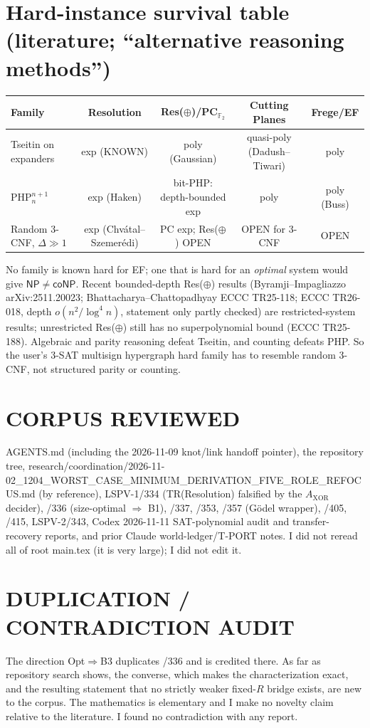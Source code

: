 \documentclass[11pt]{article}
\theoremstyle{definition}\newtheorem{definition}[theorem]{Definition}
\begin{document}
\section{Hard-instance survival table (literature; ``alternative reasoning methods'')}
\begin{center}\small
\begin{tabular}{lcccc}\toprule
Family & Resolution & Res($\oplus$)/PC$_{\mathbb F_2}$ & Cutting Planes & Frege/EF\\\midrule
Tseitin on expanders & exp (KNOWN) & poly (Gaussian) & quasi-poly (Dadush--Tiwari) & poly\\
PHP$^{n+1}_n$ & exp (Haken) & bit-PHP: depth-bounded exp & poly & poly (Buss)\\
Random 3-CNF, $\Delta\gg1$ & exp (Chv\'atal--Szemer\'edi) & PC exp; Res($\oplus$) OPEN & OPEN for 3-CNF & OPEN\\
\bottomrule\end{tabular}\end{center}
No family is known hard for EF; one that is hard for an \emph{optimal} system would give
$\mathsf{NP}\neq\mathsf{coNP}$. Recent bounded-depth Res($\oplus$) results
(Byramji--Impagliazzo arXiv:2511.20023; Bhattacharya--Chattopadhyay ECCC TR25-118;
ECCC TR26-018, depth $o(n^2/\log^4 n)$, statement only partly checked) are restricted-system
results; unrestricted Res($\oplus$) still has no superpolynomial bound (ECCC TR25-188).
Algebraic and parity reasoning defeat Tseitin, and counting defeats PHP. So the user's 3-SAT
multisign hypergraph hard family has to resemble random 3-CNF, not structured parity or counting.

\section*{CORPUS REVIEWED}
AGENTS.md (including the 2026-11-09 knot/link handoff pointer), the repository tree,
research/coordination/2026-11-02\_1204\_WORST\_CASE\_MINIMUM\_DERIVATION\_FIVE\_ROLE\_REFOCUS.md
(by reference), LSPV-1/334 (TR(Resolution) falsified by the $A_{\mathrm{XOR}}$ decider), /336 (size-optimal $\Rightarrow$ B1),
/337, /353, /357 (G\"odel wrapper), /405, /415, LSPV-2/343, Codex 2026-11-11 SAT-polynomial audit and
transfer-recovery reports, and prior Claude world-ledger/T-PORT notes. I did not reread all of root main.tex
(it is very large); I did not edit it.
\section*{DUPLICATION / CONTRADICTION AUDIT}
The direction Opt$\Rightarrow$B3 duplicates /336 and is credited there. As far as repository search
shows, the converse, which makes the characterization exact, and the resulting statement that no strictly
weaker fixed-$R$ bridge exists, are new to the corpus. The mathematics is elementary and I make no
novelty claim relative to the literature. I found no contradiction with any report.
\end{document}
